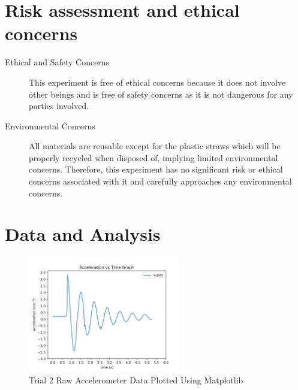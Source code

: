 \documentclass[11pt]{article}
\begin{document}
\section{Risk assessment and ethical concerns}
\begin{description}
    \item[Ethical and Safety Concerns] This experiment is free of ethical concerns because it does not involve other beings and is free of safety concerns as it is not dangerous for any parties involved.
    \item[Environmental Concerns] All materials are reusable except for the plastic straws which will be properly recycled when disposed of, implying limited environmental concerns. Therefore, this experiment has no significant risk or ethical concerns associated with it and carefully approaches any environmental concerns.
\end{description}

\section{Data and Analysis}

\begin{figure}
\centering
\vspace{-45pt}
\includegraphics[width=0.6\textwidth]{img/example_trial.png}
\caption{\label{fig:5}Trial 2 Raw Accelerometer Data Plotted Using Matplotlib}
\vspace{-15pt}
\end{figure}
\end{document}
